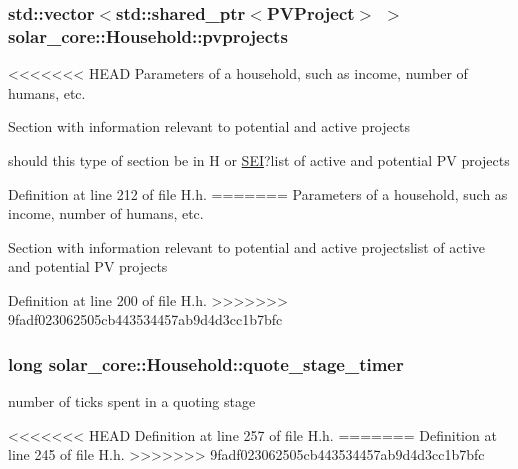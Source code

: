 \subsubsection[{pvprojects}]{\setlength{\rightskip}{0pt plus 5cm}std\+::vector$<$std\+::shared\+\_\+ptr$<${\bf P\+V\+Project}$>$ $>$ solar\+\_\+core\+::\+Household\+::pvprojects\hspace{0.3cm}{\ttfamily [protected]}}\label{classsolar__core_1_1_household_a79c0e955af98669487e0fb472811f842}
<<<<<<< HEAD
Parameters of a household, such as income, number of humans, etc. \begin{DoxyVerb} Section with information relevant to potential and active projects
\end{DoxyVerb}
 should this type of section be in H or \hyperlink{classsolar__core_1_1_s_e_i}{S\+E\+I}?list of active and potential P\+V projects 

Definition at line 212 of file H.\+h.
=======
Parameters of a household, such as income, number of humans, etc.

Section with information relevant to potential and active projectslist of active and potential P\+V projects 

Definition at line 200 of file H.\+h.
>>>>>>> 9fadf023062505cb443534457ab9d4d3cc1b7bfc

\hypertarget{classsolar__core_1_1_household_a6b35426fd691daa6d352ec34a6ec6e4d}{}
\subsubsection[{quote\+\_\+stage\+\_\+timer}]{\setlength{\rightskip}{0pt plus 5cm}long solar\+\_\+core\+::\+Household\+::quote\+\_\+stage\+\_\+timer\hspace{0.3cm}{\ttfamily [protected]}}\label{classsolar__core_1_1_household_a6b35426fd691daa6d352ec34a6ec6e4d}
number of ticks spent in a quoting stage 

<<<<<<< HEAD
Definition at line 257 of file H.\+h.
=======
Definition at line 245 of file H.\+h.
>>>>>>> 9fadf023062505cb443534457ab9d4d3cc1b7bfc

\hypertarget{classsolar__core_1_1_household_a4ae618de9a28895317824b185b57ab24}{}
